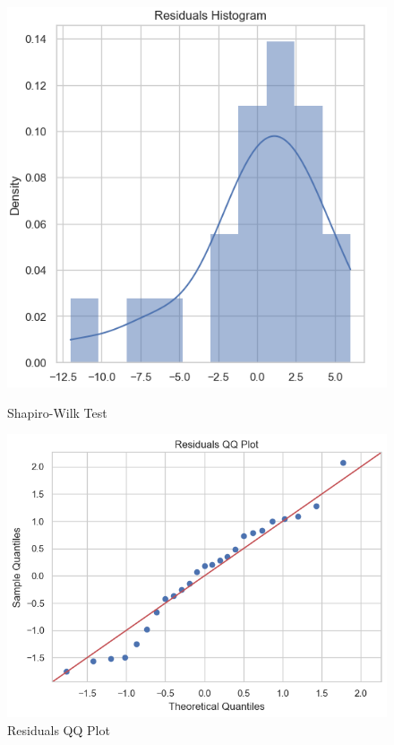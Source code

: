 \documentclass[UTF8]{ctexart}
\begin{document}
\begin{figure}[ht]
  \begin{minipage}[b]{0.42\textwidth} %
    \includegraphics[width=\textwidth]{6} %
    \caption{Shapiro-Wilk Test}
    \label{fig:image-b}
  \end{minipage}
  
  \label{fig:images}
  \begin{minipage}[b]{0.42\textwidth} %
    \includegraphics[width=\textwidth]{7} %
    \caption{Residuals QQ Plot}
    \label{fig:image-b}
  \end{minipage}
  
  \label{fig:images}
\end{figure}
\end{document}
